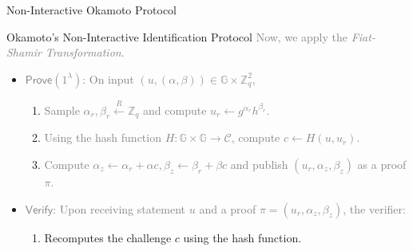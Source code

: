 \documentclass[xcolor={usenames,dvipsnames}]{beamer}
\begin{document}
    \begin{frame}{Non-Interactive Okamoto Protocol}
        \begin{block}{Okamoto's Non-Interactive Identification Protocol}
            \textcolor{gray}{Now, we apply the \textit{Fiat-Shamir Transformation}.}
            \begin{itemize}
                \item \textcolor{gray}{$\mathsf{Prove}(1^{\lambda})$: On input $(u,(\alpha,\beta)) \in \mathbb{G} \times \mathbb{Z}_q^2$, }
                \begin{enumerate}
                    \item \textcolor{gray}{Sample $\alpha_r,\beta_r \xleftarrow{R} \mathbb{Z}_q$ and compute $u_r \gets g^{\alpha_r}h^{\beta_r}$.}
                    \item \textcolor{gray}{Using the hash function $H: \mathbb{G} \times \mathbb{G} \to \mathcal{C}$, compute $c \gets H(u,u_r)$.}
                    \item \textcolor{gray}{Compute $\alpha_z \gets \alpha_r + \alpha c, \beta_z \gets \beta_r + \beta c$ and publish $(u_r,\alpha_z,\beta_z)$ as a proof $\pi$.}
                \end{enumerate}
                \item \textcolor{gray}{$\mathsf{Verify}$: Upon receiving statement $u$ and a proof $\pi=(u_r,\alpha_z,\beta_z)$, the verifier:}
                \begin{enumerate}
                    \item \textcolor{blue!80!black}{Recomputes the challenge $c$ using the hash function.}
                \end{enumerate}
            \end{itemize}
        \end{block}
    \end{frame}
\end{document}

